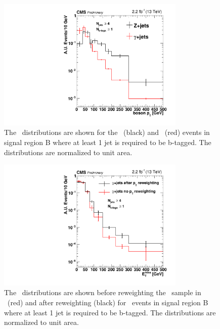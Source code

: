 \begin{figure}[!htb]
  \begin{center}
      \includegraphics[width=0.8\textwidth]{bkgd/figs/photon_SRB_2p1fb_vs_dilep_ptg_withb.pdf}
    \caption{
      The \pt\ distributions are shown for the \zjets\ (black) and \gjets\ (red) events
      in signal region B where at least 1 jet is required to be b-tagged.
      The distributions are normalized to unit area.
      \label{fig:photonptreweighting}
    }
  \end{center}
\end{figure}

\begin{figure}[!htb]
  \begin{center}
      \includegraphics[width=0.8\textwidth]{bkgd/figs/gjets_full2p1_rawMET_withb_SRB_datavsdata_comparereweighted.pdf}
    \caption{
      \label{fig:metptreweighting}
      The \MET\ distributions are shown before reweighting the \gjets\ sample in \pt\ (red) and after reweighting (black)
      for \gjets\ events in signal region B where at least 1 jet is required to be b-tagged.
      The distributions are normalized to unit area.
    }
  \end{center}
\end{figure}


